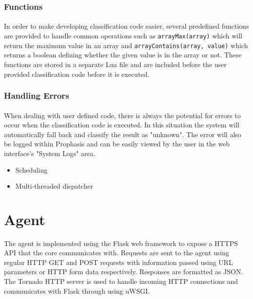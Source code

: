 \documentclass[bsc,logo,twoside]{infthesis}
\begin{document}
\subsubsection{Functions}
\paragraph*{}
	In order to make developing classification code easier, several predefined
	functions are provided to handle common operations such as
	\texttt{arrayMax(array)} which will return the maximum value in an array and
	\texttt{arrayContains(array, value)} which returns a boolean defining whether
	the given value is in the array or not.  These functions are stored in a
	separate Lua file and are included before the user provided classification code
	before it is executed.

\subsubsection{Handling Errors}
\paragraph*{}
	When dealing with user defined code, there is always the potential for errors
	to occur when the classification code is executed.  In this situation the
	system will automatically fall back and classify the result as "unknown". The
	error will also be logged within Prophasis and can be easily viewed by the user
	in the web interface's "System Logs" area.

\begin{itemize}
	\item Scheduling
	\item Multi-threaded dispatcher
\end{itemize}

\section{Agent}
\paragraph*{}
	The agent is implemented using the Flask web framework to expose a HTTPS API
	that the core communicates with.  Requests are sent to the agent using regular
	HTTP GET and POST requests with information passed using URL parameters or HTTP
	form data respectively.  Responses are formatted as JSON.  The Tornado HTTP
	server is used to handle incoming HTTP connections and communicates with Flask
	through using uWSGI.
\end{document}

